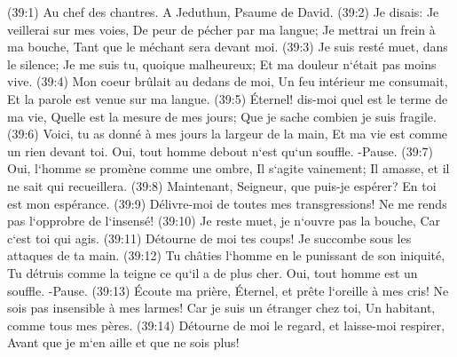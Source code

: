 \verse (39:1) Au chef des chantres. A Jeduthun, Psaume de David. (39:2) Je disais: Je veillerai sur mes voies, De peur de pécher par ma langue; Je mettrai un frein à ma bouche, Tant que le méchant sera devant moi. 
\verse (39:3) Je suis resté muet, dans le silence; Je me suis tu, quoique malheureux; Et ma douleur n`était pas moins vive. 
\verse (39:4) Mon coeur brûlait au dedans de moi, Un feu intérieur me consumait, Et la parole est venue sur ma langue. 
\verse (39:5) Éternel! dis-moi quel est le terme de ma vie, Quelle est la mesure de mes jours; Que je sache combien je suis fragile. 
\verse (39:6) Voici, tu as donné à mes jours la largeur de la main, Et ma vie est comme un rien devant toi. Oui, tout homme debout n`est qu`un souffle. -Pause. 
\verse (39:7) Oui, l`homme se promène comme une ombre, Il s`agite vainement; Il amasse, et il ne sait qui recueillera. 
\verse (39:8) Maintenant, Seigneur, que puis-je espérer? En toi est mon espérance. 
\verse (39:9) Délivre-moi de toutes mes transgressions! Ne me rends pas l`opprobre de l`insensé! 
\verse (39:10) Je reste muet, je n`ouvre pas la bouche, Car c`est toi qui agis. 
\verse (39:11) Détourne de moi tes coups! Je succombe sous les attaques de ta main. 
\verse (39:12) Tu châties l`homme en le punissant de son iniquité, Tu détruis comme la teigne ce qu`il a de plus cher. Oui, tout homme est un souffle. -Pause. 
\verse (39:13) Écoute ma prière, Éternel, et prête l`oreille à mes cris! Ne sois pas insensible à mes larmes! Car je suis un étranger chez toi, Un habitant, comme tous mes pères. 
\verse (39:14) Détourne de moi le regard, et laisse-moi respirer, Avant que je m`en aille et que ne sois plus! 

\chapter{}

